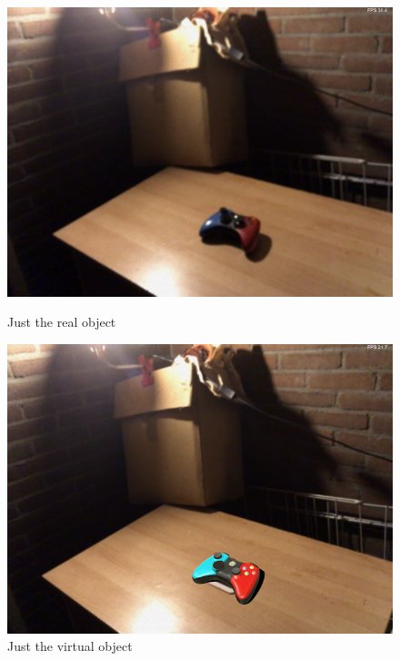 \begin{figure}[H]
\centering
\includegraphics[width=1.0\textwidth]{Figures/rest3.JPG}
\caption{Just the real object}
\includegraphics[width=1.0\textwidth]{Figures/rest4.JPG}
\caption{Just the virtual object}
\end{figure}
